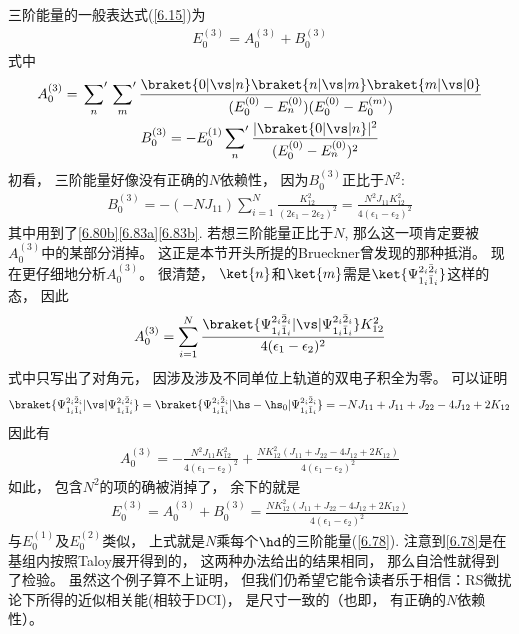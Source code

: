 三阶能量的一般表达式(\autoref{6.15})为
\begin{align}
E_0^{(3)} = A_0^{(3)} + B_{0}^{(3)}
\end{align}
式中
\begin{gather}
A_0^{(3)} = \sideset{}{'}\sum_n \sideset{}{'}\sum_m \frac{\braket{0|\vs|n}\braket{n|\vs|m}\braket{m|\vs|0}}{(E_0^{(0)} - E_n^{(0)}) (E_0^{(0)} - E_0^{(m)}) }\\
B_0^{(3)} = -E_0^{(1)}\sideset{}{'}{\sum}_n\frac{|\braket{0|\vs|n}|^2}{(E_0^{(0)} - E_n^{(0)})^2}
\end{gather}
初看，
三阶能量好像没有正确的$N$依赖性，
因为$B_0^{(3)}$正比于$N^2$:
\begin{align}
B_0^{(3)} = -(-NJ_{11}) \sum_{i=1}^{N} \frac{K_{12}^2}{(2\epsilon_1 - 2\epsilon_2)^2} = \frac{N^2J_{11}K_{12}^2}{4(\epsilon_1-\epsilon_2)^2}
\end{align}
其中用到了\autoref{6.80b}\autoref{6.83a}\autoref{6.83b}. 
若想三阶能量正比于$N$, 
那么这一项肯定要被$A_0^{(3)}$中的某部分消掉。
这正是本节开头所提的Brueckner曾发现的那种抵消。
现在更仔细地分析$A_0^{(3)}$。 
很清楚，
$\ket{n}$和$\ket{m}$需是$\ket{\Psi_{1_i\bar{1}_i}^{2_i\bar{2}_i}}$这样的态，
因此
\begin{align}
A_0^{(3)} = \sum_{i=1}^{N} \frac{\braket{\Psi_{1_i\bar{1}_i}^{2_i\bar{2}_i}|\vs|\Psi_{1_i\bar{1}_i}^{2_i\bar{2}_i}}K_{12}^2}{4(\epsilon_1 - \epsilon_2)^2}
\end{align}
式中只写出了对角元，
因涉及涉及不同单位上轨道的双电子积全为零。
可以证明
\begin{align}\braket{\Psi_{1_i\bar{1}_i}^{2_i\bar{2}_i}|\vs|\Psi_{1_i\bar{1}_i}^{2_i\bar{2}_i}} = \braket{\Psi_{1_i\bar{1}_i}^{2_i\bar{2}_i}|\hs-\hs_0|\Psi_{1_i\bar{1}_i}^{2_i\bar{2}_i}}=-NJ_{11} + J_{11} + J_{22} - 4J_{12} + 2K_{12}
\label{6.90}
\end{align}
因此有
\begin{align}
A_0^{(3)} = - \frac{N^2J_{11}K_{12}^2}{4(\epsilon_1 - \epsilon_2)^2} + \frac{NK_{12}^2(J_{11} + J_{22} - 4J_{12} + 2K_{12})}{4(\epsilon_1 - \epsilon_2)^2}
\end{align}
如此，
包含$N^2$的项的确被消掉了，
余下的就是
\begin{align}
E_0^{(3)} = A_0^{(3)} + B_0^{(3)} = \frac{NK_{12}^2(J_{11} + J_{22} - 4J_{12} + 2K_{12})}{4(\epsilon_1 - \epsilon_2)^2}
\label{eq:6.92}
\end{align}
与$E_0^{(1)}$及$E_0^{(2)}$类似，
上式就是$N$乘每个$\hd$的三阶能量(\autoref{6.78}). 
注意到\autoref{6.78}是在基组内按照Taloy展开得到的，
这两种办法给出的结果相同，
那么自洽性就得到了检验。
虽然这个例子算不上证明，
但我们仍希望它能令读者乐于相信：RS微扰论下所得的近似相关能(相较于DCI)，
是尺寸一致的（也即，
有正确的$N$依赖性）。

